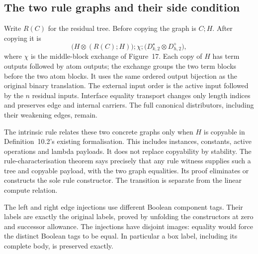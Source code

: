 


\subsection{The two rule graphs and their side condition}

Write $R(C)$ for the residual tree. Before copying the graph is $C;H$.
After copying it is
\[
  \bigl(H\otimes(R(C);H)\bigr);\chi;
  \bigl(D^{\star}_{k,2}\otimes D^{\diamond}_{h,2}\bigr),
\]
where $\chi$ is the middle-block exchange of Figure~17. Each copy of $H$
has term outputs followed by atom outputs; the exchange groups the two term
blocks before the two atom blocks. It uses the same ordered output bijection
as the original binary translation. The external input order is the active
input followed by the $n$ residual inputs. Interface equality transport
changes only length indices and preserves edge and internal carriers.
The full canonical distributors, including their weakening edges, remain.





The intrinsic rule relates these two concrete graphs only when $H$ is
copyable in Definition~10.2's existing formalisation. This includes instances,
constants, active operations and lambda payloads. It does not replace
copyability by stability. The rule-characterisation theorem says precisely
that any rule witness supplies such a tree and copyable payload, with the
two graph equalities. Its proof eliminates or constructs the sole rule
constructor. The transition is separate from the linear compute relation.



The left and right edge injections use different Boolean component tags.
Their labels are exactly the original labels, proved by unfolding the
constructors at zero and successor allowance. The injections have disjoint
images: equality would force the distinct Boolean tags to be equal.
In particular a box label, including its complete body, is preserved exactly.

